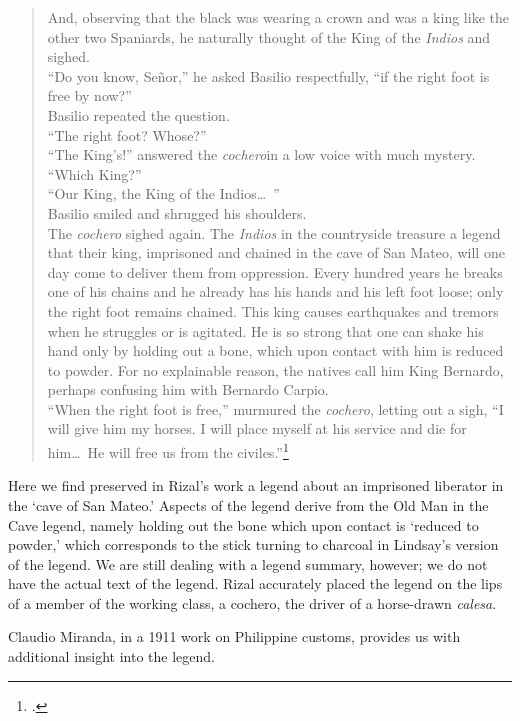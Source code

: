 \begin{quote}
And, observing that the black was wearing a crown and was a king like the other two Spaniards, he naturally thought of the King of the \textit{Indios} and sighed.\\
\enquote{Do you know, Se\~nor,} he asked Basilio respectfully, \enquote{if the right foot is free by now?}\\
Basilio repeated the question.\\
\enquote{The right foot? Whose?}\\
\enquote{The King's!} answered the \textit{cochero}in a low voice with much mystery.\\
\enquote{Which King?}\\
\enquote{Our King, the King of the Indios\ldots\ }\\
Basilio smiled and shrugged his shoulders.\\
The \textit{cochero} sighed again. The \textit{Indios} in the countryside treasure a legend that their king, imprisoned and chained in the cave of San Mateo, will one day come to deliver them from oppression. Every hundred years he breaks one of his chains and he already has his hands and his left foot loose; only the right foot remains chained. This king causes earthquakes and tremors when he struggles or is agitated. He is so strong that one can shake his hand only by holding out a bone, which upon contact with him is reduced to powder. For no explainable reason, the natives call him King Bernardo, perhaps confusing him with Bernardo Carpio.\\ 
\enquote{When the right foot is free,} murmured the \textit{cochero}, letting out a sigh, \enquote{I will give him my horses. I will place myself at his service and die for him\ldots\ He will free us from the civiles.}\footcite[36]{Rizal2007}
\end{quote}

Here we find preserved in Rizal's work a legend about an imprisoned liberator in the \enquote*{cave of San Mateo.} Aspects of the legend derive from the Old Man in the Cave legend, namely holding out the bone which upon contact is \enquote*{reduced to powder,} which corresponds to the stick turning to charcoal in Lindsay's version of the legend. We are still dealing with a legend summary, however; we do not have the actual text of the legend. Rizal accurately placed the legend on the lips of a member of the working class, a cochero, the driver of a horse-drawn \textit{calesa}.

Claudio Miranda, in a 1911 work on Philippine customs, provides us with additional insight into the legend.

